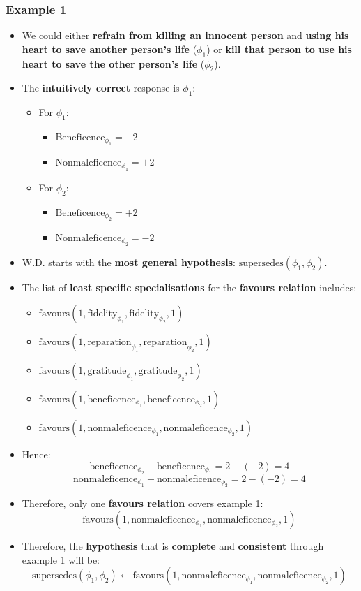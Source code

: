 \documentclass[11pt]{article}
\begin{document}
 \newpage
\subsubsection{Example 1}
\label{sec:orgf3a3c22}
\begin{itemize}
\item We could either \textbf{refrain from killing an innocent person} and \textbf{using his heart to save another person's life} (\(\phi_1\)) or \textbf{kill that person to use his heart to save the other person's life} (\(\phi_2\)).
\item The \textbf{intuitively correct} response is \(\phi_1\):
\begin{itemize}
\item For \(\phi_1\):
\begin{itemize}
\item \(\text{Beneficence}_{\phi_1} = - 2\)
\item \(\text{Nonmaleficence}_{\phi_1} = + 2\)
\end{itemize}
\item For \(\phi_2\):
\begin{itemize}
\item \(\text{Beneficence}_{\phi_2} = + 2\)
\item \(\text{Nonmaleficence}_{\phi_2} = - 2\)
\end{itemize}
\end{itemize}
\item W.D. starts with the \textbf{most general hypothesis}: \(\text{supersedes}(\phi_1, \phi_2)\).
\item The list of \textbf{least specific specialisations} for the \textbf{favours relation} includes:
\begin{itemize}
\item \(\text{favours}(1, \text{fidelity}_{\phi_1}, \text{fidelity}_{\phi_2}, 1)\)
\item \(\text{favours}(1, \text{reparation}_{\phi_1}, \text{reparation}_{\phi_2}, 1)\)
\item \(\text{favours}(1, \text{gratitude}_{\phi_1}, \text{gratitude}_{\phi_2}, 1)\)
\item \(\text{favours}(1, \text{beneficence}_{\phi_1}, \text{beneficence}_{\phi_2}, 1)\)
\item \(\text{favours}(1, \text{nonmaleficence}_{\phi_1}, \text{nonmaleficence}_{\phi_2}, 1)\)
\end{itemize}
\item Hence:
\[\text{beneficence}_{\phi_2} - \text{beneficence}_{\phi_1} = 2 - (-2) = 4\]
\[\text{nonmaleficence}_{\phi_1} - \text{nonmaleficence}_{\phi_2} = 2 - (-2) = 4\]
\item Therefore, only one \textbf{favours relation} covers example 1:
\[\text{favours}(1, \text{nonmaleficence}_{\phi_1}, \text{nonmaleficence}_{\phi_2}, 1)\]
\item Therefore, the \textbf{hypothesis} that is \textbf{complete} and \textbf{consistent} through example 1 will be:
\[\text{supersedes}(\phi_1, \phi_2) \leftarrow \text{favours}(1, \text{nonmaleficence}_{\phi_1}, \text{nonmaleficence}_{\phi_2}, 1)\]
\end{itemize}
\end{document}
